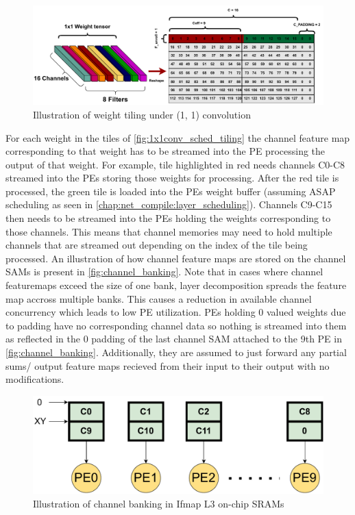 \begin{figure}[ht]
    \centering
    \includegraphics[scale=0.6]{fig/1x1conv_sched_tiling.pdf}
    \caption{Illustration of weight tiling under (1, 1) convolution}
    \label{fig:1x1conv_sched_tiling}
\end{figure}

For each weight in the tiles of \autoref{fig:1x1conv_sched_tiling} the channel
feature map corresponding to that weight has to be streamed into the PE
processing the output of that weight. For example, tile highlighted in red needs
channels C0-C8 streamed into the PEs storing those weights for processing. After
the red tile is processed, the green tile is loaded into the PEs weight buffer
(assuming ASAP scheduling as seen in
\autoref{chap:net_compile:layer_scheduling}). Channels C9-C15 then needs to be
streamed into the PEs holding the weights corresponding to those channels. This
means that channel memories may need to hold multiple channels that are streamed
out depending on the index of the tile being processed. An illustration of how
channel feature maps are stored on the channel SAMs is present in
\autoref{fig:channel_banking}. Note that in cases where channel featuremaps
exceed the size of one bank, layer decomposition spreads the feature map accross
multiple banks. This causes a reduction in available channel concurrency which
leads to low PE utilization. PEs holding 0 valued weights due to padding have no
corresponding channel data so nothing is streamed into them as reflected in the
0 padding of the last channel SAM attached to the 9th PE in
\autoref{fig:channel_banking}. Additionally, they are assumed to just forward
any partial sums/ output feature maps recieved from their input to their output
with no modifications.

\begin{figure}[ht]
    \centering
    \includegraphics[scale=0.495]{fig/1x1conv_ifmap_banking.pdf}
    \caption{Illustration of channel banking in Ifmap L3 on-chip SRAMs}
    \label{fig:channel_banking}
\end{figure}

